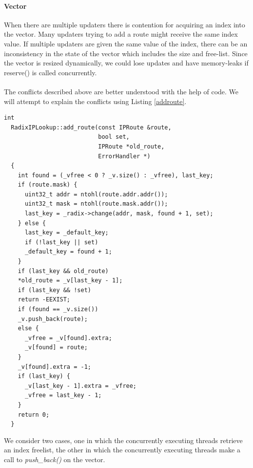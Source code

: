 \documentclass{article}
\begin{document}
\paragraph{Vector}
When there are multiple updaters there is contention for acquiring an index into the vector. Many updaters trying to add a route might receive the same index value. If multiple updaters are given the same value of the index, there can be an inconsistency in the state of the vector which includes the size and free-list. Since the vector is resized dynamically, we could lose updates and have memory-leaks if reserve() is called concurrently.
\\\\The conflicts described above are better understood with the help of code. We will attempt to explain the conflicts using Listing \ref{addroute}.
\begin{lstlisting}[caption = The add\_route function, label=addroute]
  int
  RadixIPLookup::add_route(const IPRoute &route, 
                           bool set, 
                           IPRoute *old_route, 
                           ErrorHandler *)
  {
    int found = (_vfree < 0 ? _v.size() : _vfree), last_key;
    if (route.mask) {
      uint32_t addr = ntohl(route.addr.addr());
      uint32_t mask = ntohl(route.mask.addr());
      last_key = _radix->change(addr, mask, found + 1, set);
    } else {
      last_key = _default_key;
      if (!last_key || set)
      _default_key = found + 1;
    }
    if (last_key && old_route)
    *old_route = _v[last_key - 1];
    if (last_key && !set)
    return -EEXIST;
    if (found == _v.size())
    _v.push_back(route);
    else {
      _vfree = _v[found].extra;
      _v[found] = route;
    }
    _v[found].extra = -1;
    if (last_key) {
      _v[last_key - 1].extra = _vfree;
      _vfree = last_key - 1;
    }
    return 0;
  }
\end{lstlisting}
We consider two cases, one in which the concurrently executing threads retrieve an index freelist, the other in which the concurrently executing threads make a call to \emph{push\_back()} on the vector.
\\
\end{document}
